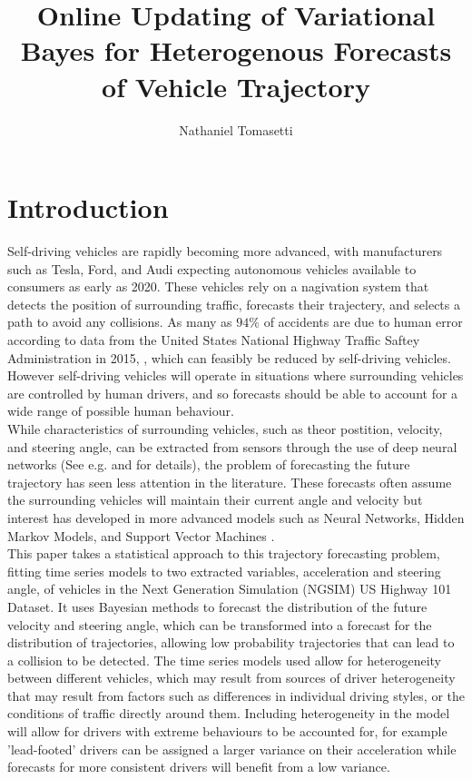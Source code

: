 \documentclass[12pt,a4paper]{article}\usepackage[]{graphicx}\usepackage[]{color}
\title{Online Updating of Variational Bayes for Heterogenous Forecasts of Vehicle Trajectory}
\author{Nathaniel Tomasetti}
\date{}
\begin{document}
\maketitle



\section{Introduction}
\label{sec:intro}

Self-driving vehicles are rapidly becoming more advanced, with manufacturers such as Tesla, Ford, and Audi expecting autonomous vehicles available to consumers as early as 2020. These vehicles rely on a nagivation system that detects the position of surrounding traffic, forecasts their trajectery, and selects a path to avoid any collisions. As many as $94\%$ of accidents are due to human error according to data from the United States National Highway Traffic Saftey Administration in 2015, \citep{NHTSA2015}, which can feasibly be reduced by self-driving vehicles. However self-driving vehicles will operate in situations where surrounding vehicles are controlled by human drivers, and so forecasts should be able to account for a wide range of possible human behaviour.
\\

While characteristics of surrounding vehicles, such as theor postition, velocity, and steering angle, can be extracted from sensors through the use of deep neural networks (See e.g. \citet{Woo2016a} and \citet{Tian2017} for details), the problem of forecasting the future trajectory has seen less attention in the literature. These forecasts often assume the surrounding vehicles will maintain their current angle and velocity \citep{Gindele2010, Houenou2013, Bautista2017, Waymo2017} but interest has developed in more advanced models such as Neural Networks, Hidden Markov Models, and Support Vector Machines \citep{Ding2013, Woo2016b, Geng2017, Woo2017}.
\\

This paper takes a statistical approach to this trajectory forecasting problem, fitting time series models to two extracted variables, acceleration and steering angle, of vehicles in the Next Generation Simulation (NGSIM) US Highway 101 Dataset. It uses Bayesian methods to forecast the distribution of the future velocity and steering angle, which can be transformed into a forecast for the distribution of trajectories, allowing low probability trajectories that can lead to a collision to be detected. The time series models used allow for heterogeneity between different vehicles, which may result from sources of driver heterogeneity that may result from factors such as differences in individual driving styles, or the conditions of traffic directly around them. Including heterogeneity in the model will allow for drivers with extreme behaviours to be accounted for, for example 'lead-footed' drivers can be assigned a larger variance on their acceleration while forecasts for more consistent drivers will benefit from a low variance.
\\
\end{document}
